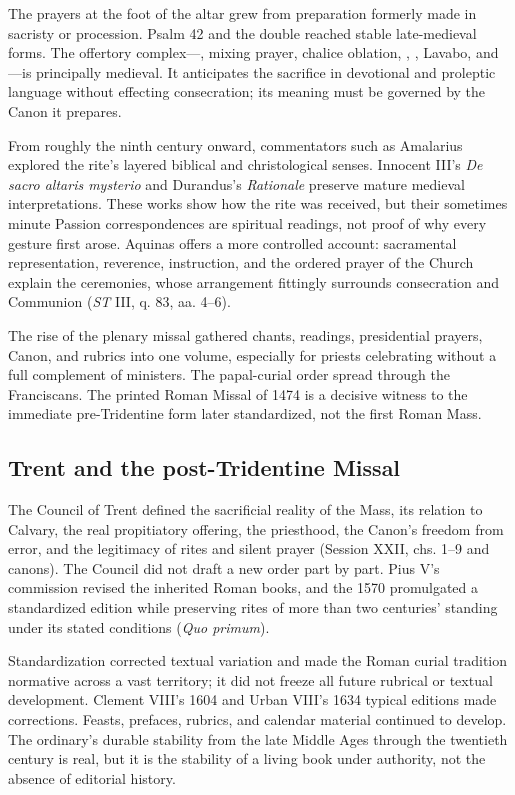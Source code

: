 The prayers at the foot of the altar grew from preparation formerly made in sacristy or procession. Psalm 42 and the double  reached stable late-medieval forms. The offertory complex---, mixing prayer, chalice oblation, , , Lavabo, and ---is principally medieval. It anticipates the sacrifice in devotional and proleptic language without effecting consecration; its meaning must be governed by the Canon it prepares.

From roughly the ninth century onward, commentators such as Amalarius explored the rite's layered biblical and christological senses. Innocent III's \emph{De sacro altaris mysterio} and Durandus's \emph{Rationale} preserve mature medieval interpretations. These works show how the rite was received, but their sometimes minute Passion correspondences are spiritual readings, not proof of why every gesture first arose. Aquinas offers a more controlled account: sacramental representation, reverence, instruction, and the ordered prayer of the Church explain the ceremonies, whose arrangement fittingly surrounds consecration and Communion (\emph{ST} III, q. 83, aa. 4--6).

The rise of the plenary missal gathered chants, readings, presidential prayers, Canon, and rubrics into one volume, especially for priests celebrating without a full complement of ministers. The papal-curial order spread through the Franciscans. The printed Roman Missal of 1474 is a decisive witness to the immediate pre-Tridentine form later standardized, not the first Roman Mass.

\subsection{Trent and the post-Tridentine Missal}

The Council of Trent defined the sacrificial reality of the Mass, its relation to Calvary, the real propitiatory offering, the priesthood, the Canon's freedom from error, and the legitimacy of rites and silent prayer (Session XXII, chs. 1--9 and canons). The Council did not draft a new order part by part. Pius V's commission revised the inherited Roman books, and the 1570  promulgated a standardized edition while preserving rites of more than two centuries' standing under its stated conditions (\emph{Quo primum}).

Standardization corrected textual variation and made the Roman curial tradition normative across a vast territory; it did not freeze all future rubrical or textual development. Clement VIII's 1604 and Urban VIII's 1634 typical editions made corrections. Feasts, prefaces, rubrics, and calendar material continued to develop. The ordinary's durable stability from the late Middle Ages through the twentieth century is real, but it is the stability of a living book under authority, not the absence of editorial history.

